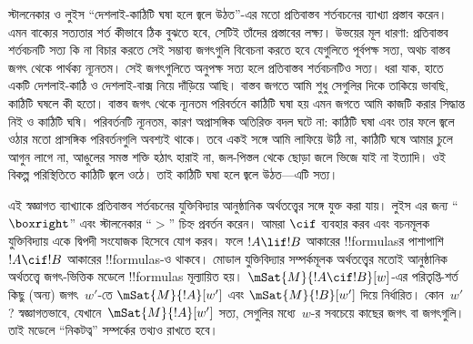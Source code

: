 \documentclass[../../../include/open-logic-section]{subfiles}
\begin{document}


স্টালনেকার ও লুইস ``দেশলাই-কাঠিটি ঘষা হলে জ্বলে উঠত''-এর
মতো প্রতিবাস্তব শর্তবচনের ব্যাখ্যা প্রস্তাব করেন। এমন
বাক্যের সত্যতার শর্ত কীভাবে ঠিক বুঝতে হবে, সেটিই তাঁদের
প্রস্তাবের লক্ষ্য। উভয়ের মূল ধারণা: প্রতিবাস্তব শর্তবচনটি
সত্য কি না বিচার করতে সেই সম্ভাব্য জগৎগুলি বিবেচনা করতে
হবে যেগুলিতে পূর্বপক্ষ সত্য, অথচ বাস্তব জগৎ থেকে পার্থক্য
ন্যূনতম। সেই জগৎগুলিতে অনুপক্ষ সত্য হলে প্রতিবাস্তব
শর্তবচনটিও সত্য। ধরা যাক, হাতে একটি দেশলাই-কাঠি ও
দেশলাই-বাক্স নিয়ে দাঁড়িয়ে আছি। বাস্তব জগতে আমি শুধু
সেগুলির দিকে তাকিয়ে ভাবছি, কাঠিটি ঘষলে কী হতো।
বাস্তব জগৎ থেকে ন্যূনতম পরিবর্তনে কাঠিটি ঘষা হয় এমন
জগতে আমি কাজটি করার সিদ্ধান্ত নিই ও কাঠিটি ঘষি।
পরিবর্তনটি ন্যূনতম, কারণ অপ্রাসঙ্গিক অতিরিক্ত বদল ঘটে না:
কাঠিটি ঘষা এবং তার ফলে জ্বলে ওঠার মতো প্রাসঙ্গিক পরিবর্তনগুলি
অবশ্যই থাকে। তবে একই সঙ্গে
আমি লাফিয়ে উঠি না, কাঠিটি ঘষে আমার চুলে আগুন লাগে
না, আঙুলের সমস্ত শক্তি হঠাৎ হারাই না, জল-পিস্তল থেকে
ছোড়া জলে ভিজে যাই না ইত্যাদি। ওই বিকল্প পরিস্থিতিতে
কাঠিটি জ্বলে ওঠে। তাই কাঠিটি ঘষা হলে জ্বলে উঠত—এটি
সত্য।

এই স্বজ্ঞাগত ব্যাখ্যাকে প্রতিবাস্তব শর্তবচনের যুক্তিবিদ্যার
আনুষ্ঠানিক অর্থতত্ত্বের সঙ্গে যুক্ত করা যায়। লুইস এর
জন্য ``$\boxright$'' এবং স্টালনেকার ``$>$'' চিহ্ন
প্রবর্তন করেন। আমরা $\cif$ ব্যবহার করব এবং বচনমূলক
যুক্তিবিদ্যায় একে দ্বিপদী সংযোজক হিসেবে যোগ করব। ফলে
$!A \lif !B$ আকারের !!{formula}sর পাশাপাশি
$!A \cif !B$ আকারের !!{formula}s-ও থাকবে। মোডাল
যুক্তিবিদ্যার সম্পর্কমূলক অর্থতত্ত্বের মতোই আনুষ্ঠানিক
অর্থতত্ত্বে জগৎ-ভিত্তিক মডেলে !!{formula}s মূল্যায়িত হয়।
$\mSat{M}{!A \cif !B}[w]$-এর পরিতৃপ্তি-শর্ত
কিছু (অন্য) জগৎ~$w'$-তে $\mSat{M}{!A}[w']$ এবং
$\mSat{M}{!B}[w']$ দিয়ে নির্ধারিত। কোন~$w'$?
স্বজ্ঞাগতভাবে, যেখানে~$\mSat{M}{!A}[w']$ সত্য, সেগুলির মধ্যে~$w$-র
সবচেয়ে কাছের জগৎ বা জগৎগুলি। তাই মডেলে ``নিকটত্ব''
সম্পর্কের তথ্যও রাখতে হবে।
\end{document}

